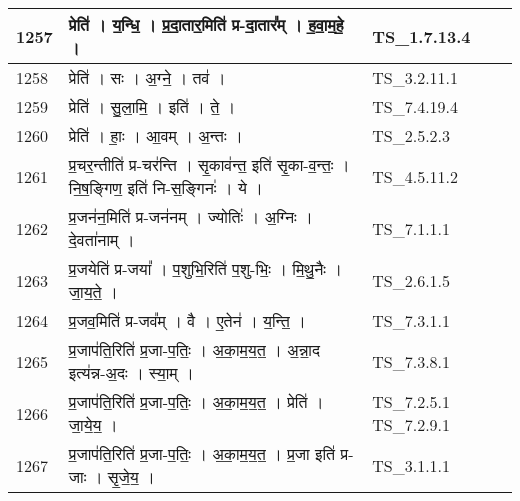 \documentclass[17pt]{extarticle}
\begin{document}
\begin{longtable}{||p{0.4in}||p{4.9in}||p{0.9in}||}
    1257 & प्रेति॑   ।   य॒न्धि॒   ।   प्र॒दा॒तार॒मिति॑ प्र{-}दा॒तार᳚म्   ।   ह॒वा॒म॒हे॒   ।    & TS\_1.7.13.4       \\
    
    \hline
        
    1258 & प्रेति॑   ।   सः   ।   अ॒ग्ने॒   ।   तव॑   ।    & TS\_3.2.11.1       \\
    
    \hline
        
    1259 & प्रेति॑   ।   सु॒ला॒मि॒   ।   इति॑   ।   ते॒   ।    & TS\_7.4.19.4       \\
    
    \hline
        
    1260 & प्रेति॑   ।   हाः॒   ।   आ॒वम्   ।   अ॒न्तः   ।    & TS\_2.5.2.3       \\
    
    \hline
        
    1261 & प्र॒चर॒न्तीति॑ प्र{-}चर॑न्ति   ।   सृ॒काव॑न्त॒ इति॑ सृ॒का{-}व॒न्तः॒   ।   नि॒ष॒ङ्गिण॒ इति॑ नि{-}स॒ङ्गिनः॑   ।   ये   ।    & TS\_4.5.11.2       \\
    
    \hline
        
    1262 & प्र॒जन॑न॒मिति॑ प्र{-}जन॑नम्   ।   ज्योतिः॑   ।   अ॒ग्निः   ।   दे॒वता॑नाम्   ।    & TS\_7.1.1.1       \\
    
    \hline
        
    1263 & प्र॒जयेति॑ प्र{-}जया᳚   ।   प॒शुभि॒रिति॑ प॒शु{-}भिः॒   ।   मि॒थु॒नैः   ।   जा॒य॒ते॒   ।    & TS\_2.6.1.5       \\
    
    \hline
        
    1264 & प्र॒जव॒मिति॑ प्र{-}जव᳚म्   ।   वै   ।   ए॒तेन॑   ।   य॒न्ति॒   ।    & TS\_7.3.1.1       \\
    
    \hline
        
    1265 & प्र॒जाप॑ति॒रिति॑ प्र॒जा{-}प॒तिः॒   ।   अ॒का॒म॒य॒त॒   ।   अ॒न्ना॒द इत्य॑न्न{-}अ॒दः   ।   स्या॒म्   ।    & TS\_7.3.8.1       \\
    
    \hline
        
    1266 & प्र॒जाप॑ति॒रिति॑ प्र॒जा{-}प॒तिः॒   ।   अ॒का॒म॒य॒त॒   ।   प्रेति॑   ।   जा॒ये॒य॒   ।    & TS\_7.2.5.1 TS\_7.2.9.1       \\
    
    \hline
        
    1267 & प्र॒जाप॑ति॒रिति॑ प्र॒जा{-}प॒तिः॒   ।   अ॒का॒म॒य॒त॒   ।   प्र॒जा इति॑ प्र{-}जाः   ।   सृ॒जे॒य॒   ।    & TS\_3.1.1.1       \\
    

\end{longtable}
\end{document}
